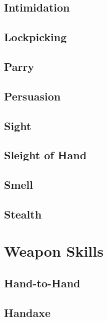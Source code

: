 \subsection{Intimidation}\label{skill:intimidation}

\subsection{Lockpicking}\label{skill:lockpicking}

\subsection{Parry}\label{skill:parry}

\subsection{Persuasion}\label{skill:persuasion}

\subsection{Sight}\label{skill:sight}

\subsection{Sleight of Hand}\label{skill:sleight-of-hand}

\subsection{Smell}\label{skill:smell}

\subsection{Stealth}\label{skill:stealth}

\section{Weapon Skills}

\subsection{Hand-to-Hand}\label{skill:hand-to-hand}

\subsection{Handaxe}\label{skill:handaxe}


